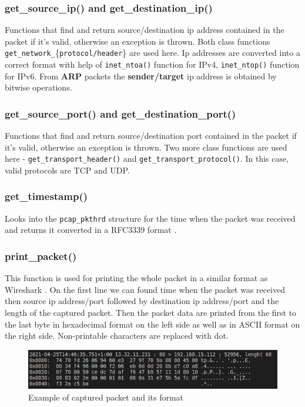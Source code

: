 \documentclass[a4paper,12pt]{article}
\begin{document}
        \subsubsection{get\_source\_ip() and get\_destination\_ip()}
        Functions that find and return source/destination ip address
        contained in the packet if it's valid, otherwise an exception is thrown. Both class functions \texttt{get\_network\_}\{\texttt{protocol/header}\} are used here. Ip addresses are converted into a correct format with help of \texttt{inet\_ntoa()} function for IPv4, \texttt{inet\_ntop()} function for IPv6. From \textbf{ARP} packets the \textbf{sender/target} ip address is obtained by bitwise operations.
        
        \subsubsection{get\_source\_port() and get\_destination\_port()}
        Functions that find and return source/destination port contained in the packet if it's valid, otherwise an exception is thrown. Two more class functions are used here - \texttt{get\_transport\_header()} and \texttt{get\_transport\_protocol()}. In this case, valid protocols
        are TCP and UDP.
                
        \subsubsection{get\_timestamp()}
        Looks into the \texttt{pcap\_pkthrd} structure for the time when the packet was received and returns it converted in a RFC3339 format \cite{rfc}.
        
        \subsubsection{print\_packet()}
        This function is used for printing the whole packet in a similar format as Wireshark \cite{wireshark}. On the first line we can found time when the packet was received then source ip address/port followed by destination ip address/port and the length of the captured packet. Then the packet data are printed from the first to the last byte in hexadecimal format on the left side as well as in ASCII format on the right side. Non-printable characters are replaced with dot. 
        
        \begin{figure}[h]
            \includegraphics[width=\linewidth]{packet_example.png}
            \caption{Example of captured packet and its format}
        \end{figure}
\end{document}
